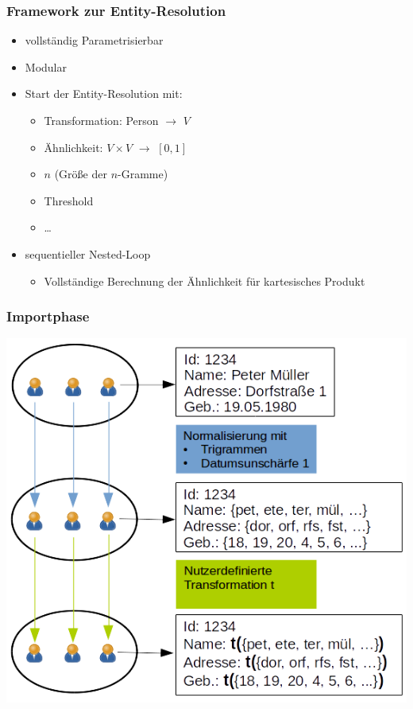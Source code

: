 \begin{frame}
	\frametitle{Framework zur Entity-Resolution}

	\begin{itemize}
		\setlength\itemsep{\stdItemSep}
		\item vollständig Parametrisierbar
		\item Modular
		\item Start der Entity-Resolution mit:
		\begin{itemize}
			\setlength\itemsep{\stdItemSep}
			\vspace*{\stdItemSep}
			\item Transformation: Person $\rightarrow$ $V$
			\item Ähnlichkeit: $V \times V$ $\rightarrow$ $[0,1]$
			\item $n$ (Größe der $n$-Gramme)
			\item Threshold
			\item \ldots
		\end{itemize}
		\item sequentieller Nested-Loop
		\begin{itemize}
			\setlength\itemsep{\stdItemSep}
			\vspace*{\stdItemSep}
			\item Vollständige Berechnung der Ähnlichkeit für kartesisches Produkt
		\end{itemize}
	\end{itemize}
\end{frame}


\begin{frame}
	\frametitle{Importphase}
	\begin{center}
	\vspace*{-.2cm}
	\includegraphics[height=0.9\textheight]{Bilder/Importphase.png}
	\end{center}
\end{frame}
